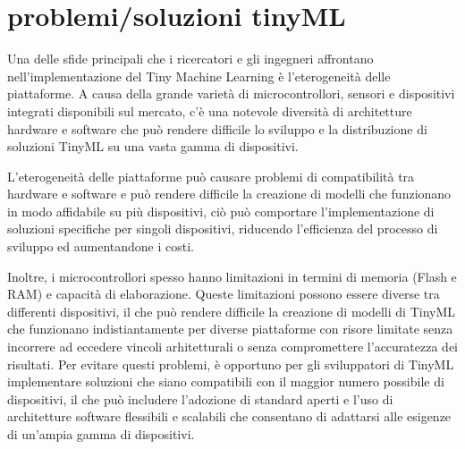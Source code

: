 \section{problemi/soluzioni tinyML}

Una delle sfide principali che i ricercatori e gli ingegneri affrontano nell'implementazione del Tiny Machine Learning è l'eterogeneità delle piattaforme. A causa della grande varietà di microcontrollori, sensori e dispositivi integrati disponibili sul mercato, c'è una notevole diversità di architetture hardware e software che può rendere difficile lo sviluppo e la distribuzione di soluzioni TinyML su una vasta gamma di dispositivi. 

L'eterogeneità delle piattaforme può causare problemi di compatibilità tra hardware e software e può rendere difficile la creazione di modelli che funzionano in modo affidabile su più dispositivi, ciò può comportare l'implementazione di soluzioni specifiche per singoli dispositivi, riducendo l'efficienza del processo di sviluppo ed aumentandone i costi.

Inoltre, i microcontrollori spesso hanno limitazioni in termini di memoria (Flash e RAM) e capacità di elaborazione. Queste limitazioni possono essere diverse tra differenti dispositivi, il che può rendere difficile la creazione di modelli di TinyML che funzionano indistiantamente per diverse piattaforme con risore limitate senza incorrere ad eccedere vincoli arhitetturali o senza compromettere l'accuratezza dei risultati.
Per evitare questi problemi, è opportuno per gli sviluppatori di TinyML implementare soluzioni che siano compatibili con il maggior numero possibile di dispositivi, il che può includere l'adozione di standard aperti e l'uso di architetture software flessibili e scalabili che consentano di adattarsi alle esigenze di un'ampia gamma di dispositivi.

